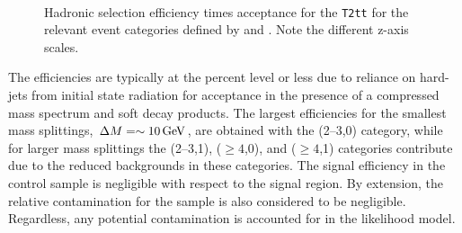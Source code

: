 \begin{figure}[!h]
  \begin{center}
     \\
    \caption{Hadronic selection efficiency times acceptance for the \texttt{T2tt}
      for the relevant event categories defined by \njet and \nb.
       Note the different z-axis scales.}
    \label{fig:sms-eff-t2_4body}
  \end{center}
\end{figure}


The efficiencies are typically at the percent level or less due to
reliance on hard-\Pt jets from initial state radiation for acceptance
in the presence of a compressed mass spectrum and soft decay
products. The largest efficiencies for the smallest mass splittings,
$\Delta M = \sim10\,\text{Ge\hspace{-.08em}V}$, are obtained with the (2--3,0) category,
while for larger mass splittings the (2--3,1), ($\geq 4$,0), and
($\geq 4$,1) categories contribute due to the reduced backgrounds in
these categories. The signal efficiency in the \mj control sample is
negligible with respect to the signal region. By extension, the
relative contamination for the \mmj sample is also considered to be
negligible. Regardless, any potential contamination is accounted for
in the likelihood model.

